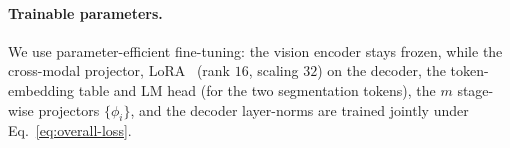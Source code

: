 \paragraph{Trainable parameters.}
We use parameter-efficient fine-tuning: the vision encoder stays frozen, while the cross-modal projector, LoRA~\cite{hu2021loralowrankadaptationlarge} (rank $16$, scaling $32$) on the decoder, the token-embedding table and LM head (for the two segmentation tokens), the $m$ stage-wise projectors $\{\phi_i\}$, and the decoder layer-norms are trained jointly under Eq.~\ref{eq:overall-loss}.



